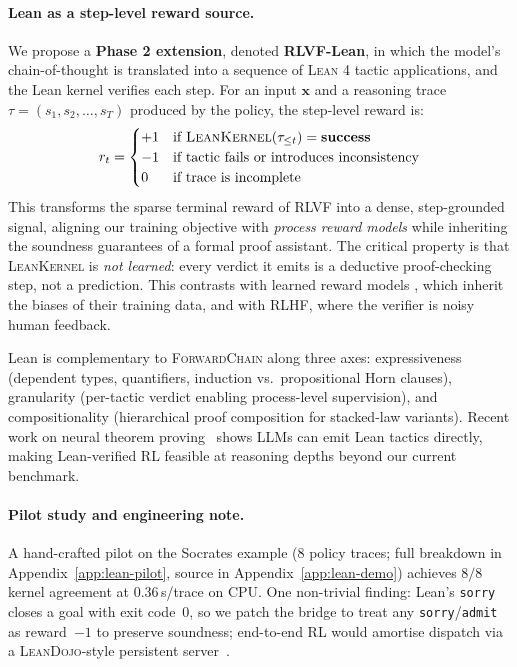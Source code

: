 \documentclass{article} %
\begin{document}
\paragraph{Lean as a step-level reward source.}
We propose a \textbf{Phase 2 extension}, denoted \textbf{RLVF-Lean}, in which the model's chain-of-thought is translated into a sequence of \textsc{Lean 4} \citep{moura2021lean4} tactic applications, and the Lean kernel verifies each step. For an input $\mathbf{x}$ and a reasoning trace $\tau = (s_1, s_2, \dots, s_T)$ produced by the policy, the step-level reward is:
\begin{equation}
r_t = \begin{cases} +1 & \text{if } \textsc{LeanKernel}(\tau_{\leq t}) = \mathbf{success} \\ -1 & \text{if tactic fails or introduces inconsistency} \\ 0 & \text{if trace is incomplete} \end{cases}
\label{eq:lean-reward}
\end{equation}
This transforms the sparse terminal reward of RLVF into a dense, step-grounded signal, aligning our training objective with \emph{process reward models} \citep{lightman2024prm} while inheriting the soundness guarantees of a formal proof assistant. The critical property is that \textsc{LeanKernel} is \emph{not learned}: every verdict it emits is a deductive proof-checking step, not a prediction. This contrasts with learned reward models \citep{lightman2024prm}, which inherit the biases of their training data, and with RLHF, where the verifier is noisy human feedback.

Lean is complementary to \textsc{ForwardChain} along three axes: expressiveness (dependent types, quantifiers, induction vs.\ propositional Horn clauses), granularity (per-tactic verdict enabling process-level supervision), and compositionality (hierarchical proof composition for stacked-law variants). Recent work on neural theorem proving~\citep{yang2023leandojo,polu2020gpt-f,alphaproof2024} shows LLMs can emit Lean tactics directly, making Lean-verified RL feasible at reasoning depths beyond our current benchmark.

\paragraph{Pilot study and engineering note.}
A hand-crafted pilot on the Socrates example (8 policy traces; full breakdown in Appendix~\ref{app:lean-pilot}, source in Appendix~\ref{app:lean-demo}) achieves $8/8$ kernel agreement at $0.36$\,s/trace on CPU. One non-trivial finding: Lean's \texttt{sorry} closes a goal with exit code~$0$, so we patch the bridge to treat any \texttt{sorry}/\texttt{admit} as reward~$-1$ to preserve soundness; end-to-end RL would amortise dispatch via a \textsc{LeanDojo}-style persistent server~\citep{yang2023leandojo}.
\end{document}
